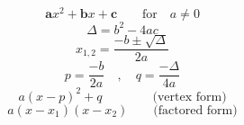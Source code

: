 $$\mathbf{a}x^2+\mathbf{b}x+\mathbf{c} \qquad\textrm{for}\quad a\neq0$$
$$\Delta = b^2-4ac$$
$$x_{1,2}=\frac{-b\pm\sqrt{\Delta}}{2a}$$
$$p=\frac{-b}{2a} \quad , \quad  q=\frac{-\Delta}{4a}$$
$$a(x-p)^2+q \qquad\qquad \textrm{(vertex form)}$$
$$a(x-x_1)(x-x_2) \qquad \textrm{(factored form)}$$